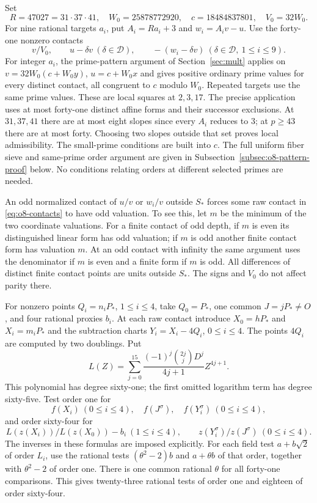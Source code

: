 \documentclass[11pt]{article}
\theoremstyle{definition}
\theoremstyle{remark}
\begin{document}
Set
\[
 R=47027=31\cdot37\cdot41,\quad W_0=25878772920,
 \quad c=18484837801,\quad V_0=32W_0.
\]
For nine rational targets $a_i$, put $A_i=Ra_i+3$ and
$w_i=A_iv-u$. Use the forty-one nonzero contacts
\begin{equation}\label{eq:o8-contacts}
 v/V_0,\qquad u-\delta v\ (\delta\in\mathcal D),\qquad
 -(w_i-\delta v)\ (\delta\in\mathcal D,\ 1\le i\le9).
\end{equation}
For integer $a_i$, the prime-pattern argument of
Section~\ref{sec:mult} applies on
$v=32W_0(c+W_0y)$, $u=c+W_0x$ and gives positive ordinary prime
values for every distinct contact, all congruent to $c$ modulo $W_0$.
Repeated targets use the same prime values. These are local squares
at $2,3,17$. The precise application uses at most forty-one distinct
affine forms and their successor exclusions. At $31,37,41$ there are
at most eight slopes since every $A_i$ reduces to $3$; at $p\ge43$
there are at most forty. Choosing two slopes outside that set proves
local admissibility. The small-prime conditions are built into $c$.
The full uniform fiber sieve and same-prime order argument are given
in Subsection~\ref{subsec:o8-pattern-proof} below. No conditions relating orders at
different selected primes are needed.

An odd normalized contact of $u/v$ or $w_i/v$ outside $S_*$ forces
some raw contact in \eqref{eq:o8-contacts} to have odd valuation.
To see this, let $m$ be the minimum of the two coordinate valuations.
For a finite contact of odd depth, if $m$ is even its distinguished
linear form has odd valuation; if $m$ is odd another finite contact
form has valuation $m$. At an odd contact with infinity the same
argument uses the denominator if $m$ is even and a finite form if
$m$ is odd. All differences of distinct finite contact points are units
outside $S_*$. The signs and $V_0$ do not affect parity there.

For nonzero points $Q_i=n_iP_*$, $1\le i\le4$, take $Q_0=P_*$,
one common $J=jP_*\ne O$, and four rational proxies $b_i$.
At each raw contact introduce $X_0=hP_*$ and $X_i=m_iP_*$ and
the subtraction charts $Y_i=X_i-4Q_i$, $0\le i\le4$.
The points $4Q_i$ are computed by two doublings. Put
\[
 L(Z)=\sum_{j=0}^{15}
       \frac{(-1)^j\binom{2j}{j}D^j}{4j+1}Z^{4j+1}.
\]
This polynomial has degree sixty-one; the first omitted logarithm term
has degree sixty-five. Test order one for
\[
 f(X_i)\ (0\le i\le4),\quad f(J^\sigma),\quad
 f(Y_i^\sigma)\ (0\le i\le4),
\]
and order sixty-four for
\[
 L(z(X_i))/L(z(X_0))-b_i\ (1\le i\le4),\qquad
 z(Y_i^\sigma)/z(J^\sigma)\ (0\le i\le4).
\]
The inverses in these formulas are imposed explicitly. For each field
test $a+b\sqrt2$ of order $L_i$, use the rational tests
$(\theta^2-2)b$ and $a+\theta b$ of that order, together with
$\theta^2-2$ of order one. There is one common rational $\theta$
for all forty-one comparisons. This gives twenty-three rational tests
of order one and eighteen of order sixty-four.
\end{document}
